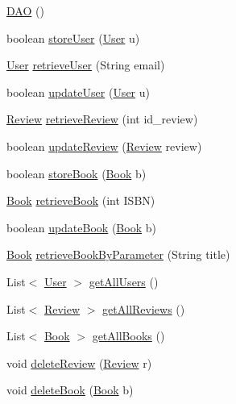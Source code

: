 \begin{DoxyCompactItemize}
\item 
\hyperlink{classdb_1_1_d_a_o_abd016ae9834e8d5e94d96f551d1636e7}{D\+AO} ()
\item 
boolean \hyperlink{classdb_1_1_d_a_o_a1600c5d7d28eb225fc7c244fdfb16150}{store\+User} (\hyperlink{classserver_1_1data_1_1_user}{User} u)
\item 
\hyperlink{classserver_1_1data_1_1_user}{User} \hyperlink{classdb_1_1_d_a_o_a6da084ffd9b0da23acba9dc68e747303}{retrieve\+User} (String email)
\item 
boolean \hyperlink{classdb_1_1_d_a_o_a5cd4462deb77065c2d12471cd73b3ec8}{update\+User} (\hyperlink{classserver_1_1data_1_1_user}{User} u)
\item 
\hyperlink{classserver_1_1data_1_1_review}{Review} \hyperlink{classdb_1_1_d_a_o_ae43e182fae8ee7028db6ff17c2d5768f}{retrieve\+Review} (int id\+\_\+review)
\item 
boolean \hyperlink{classdb_1_1_d_a_o_ab73940ac7600902ea7d52bcd041a9c6e}{update\+Review} (\hyperlink{classserver_1_1data_1_1_review}{Review} review)
\item 
boolean \hyperlink{classdb_1_1_d_a_o_a036246b8124d7ac8a36e3eaafd3eb81a}{store\+Book} (\hyperlink{classserver_1_1data_1_1_book}{Book} b)
\item 
\hyperlink{classserver_1_1data_1_1_book}{Book} \hyperlink{classdb_1_1_d_a_o_ade778f907d0a74dc27c4fc03f8709815}{retrieve\+Book} (int I\+S\+BN)
\item 
boolean \hyperlink{classdb_1_1_d_a_o_a4ea10c177ef93a3084ed74b38556adca}{update\+Book} (\hyperlink{classserver_1_1data_1_1_book}{Book} b)
\item 
\hyperlink{classserver_1_1data_1_1_book}{Book} \hyperlink{classdb_1_1_d_a_o_a1f8580da682f8a8af4896c491c3b6611}{retrieve\+Book\+By\+Parameter} (String title)
\item 
List$<$ \hyperlink{classserver_1_1data_1_1_user}{User} $>$ \hyperlink{classdb_1_1_d_a_o_a3b627b7177990799fd02e0c38b8adb70}{get\+All\+Users} ()
\item 
List$<$ \hyperlink{classserver_1_1data_1_1_review}{Review} $>$ \hyperlink{classdb_1_1_d_a_o_a4df79c7d44b050aa55451db2ecf342f6}{get\+All\+Reviews} ()
\item 
List$<$ \hyperlink{classserver_1_1data_1_1_book}{Book} $>$ \hyperlink{classdb_1_1_d_a_o_a82a8c60ccd0de2f70b69bc36d29aeef8}{get\+All\+Books} ()
\item 
void \hyperlink{classdb_1_1_d_a_o_aa033f83155deb72d59492bcb2b8e4d3a}{delete\+Review} (\hyperlink{classserver_1_1data_1_1_review}{Review} r)
\item 
void \hyperlink{classdb_1_1_d_a_o_a65f6a816c5f6dfb07178daf490f56fdc}{delete\+Book} (\hyperlink{classserver_1_1data_1_1_book}{Book} b)
\end{DoxyCompactItemize}


